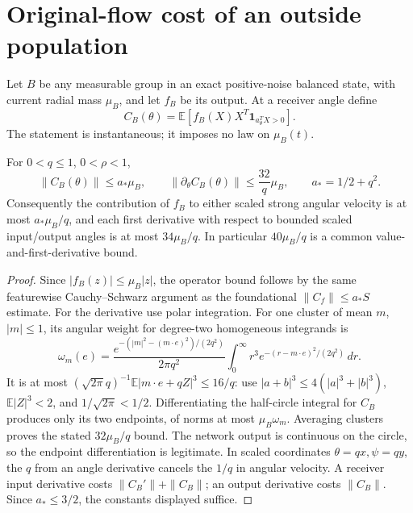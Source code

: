 \documentclass[11pt]{article}
\numberwithin{equation}{section}
\theoremstyle{remark}\newtheorem{remark}[theorem]{Remark}
\newcommand{\dd}{\,d}\newcommand{\E}{\mathbb E}\newcommand{\R}{\mathbb R}
\begin{document}
\section{Original-flow cost of an outside population}\label{inc:AN02:profile:v1:outside}
Let $B$ be any measurable group in an exact positive-noise balanced state, with current radial mass $\mu_B$, and let $f_B$ be its output. At a receiver angle define
\[
 C_B(\theta)=\E[f_B(X)X^T\mathbf1_{a_\theta^TX>0}].
\]
The statement is instantaneous; it imposes no law on $\mu_B(t)$.
\begin{proposition}\label{inc:AN02:profile:v1:cost}
For $0<q\le1$, $0<\rho<1$,
\[
 \|C_B(\theta)\|\le a_*\mu_B,\qquad
 \|\partial_\theta C_B(\theta)\|\le\frac{32}{q}\mu_B,
 \qquad a_*=1/2+q^2.
\]
Consequently the contribution of $f_B$ to either scaled strong angular velocity is at most $a_*\mu_B/q$, and each first derivative with respect to bounded scaled input/output angles is at most $34\mu_B/q$. In particular $40\mu_B/q$ is a common value-and-first-derivative bound.
\end{proposition}
\begin{proof}
Since $|f_B(z)|\le\mu_B|z|$, the operator bound follows by the same featurewise Cauchy--Schwarz argument as the foundational $\|C_f\|\le a_*S$ estimate. For the derivative use polar integration. For one cluster of mean $m$, $|m|\le1$, its angular weight for degree-two homogeneous integrands is
\[
 \omega_m(e)=\frac{e^{-(|m|^2-(m\cdot e)^2)/(2q^2)}}{2\pi q^2}
 \int_0^\infty r^3 e^{-(r-m\cdot e)^2/(2q^2)}\dd r.
\]
It is at most $(\sqrt{2\pi}q)^{-1}\E|m\cdot e+qZ|^3\le16/q$: use $|a+b|^3\le4(|a|^3+|b|^3)$, $\E|Z|^3<2$, and $1/\sqrt{2\pi}<1/2$. Differentiating the half-circle integral for $C_B$ produces only its two endpoints, of norms at most $\mu_B\omega_m$. Averaging clusters proves the stated $32\mu_B/q$ bound. The network output is continuous on the circle, so the endpoint differentiation is legitimate. In scaled coordinates $\theta=qx,\psi=qy$, the $q$ from an angle derivative cancels the $1/q$ in angular velocity. A receiver input derivative costs $\|C_B'\|+\|C_B\|$; an output derivative costs $\|C_B\|$. Since $a_*\le3/2$, the constants displayed suffice.
\end{proof}
\end{document}

